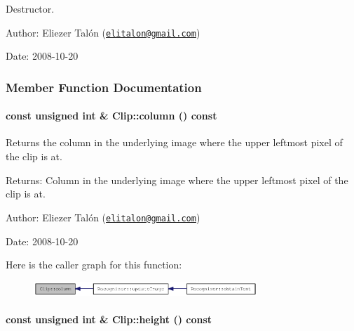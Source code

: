 Destructor. 

\begin{Desc}
\item[Author:]Eliezer Talón (\href{mailto:elitalon@gmail.com}{\tt elitalon@gmail.com}) \end{Desc}
\begin{Desc}
\item[Date:]2008-10-20 \end{Desc}


\subsubsection{Member Function Documentation}
\hypertarget{class_clip_06a34378fa0f23425d10bb04e9972a26}{
\paragraph[{column}]{\setlength{\rightskip}{0pt plus 5cm}const unsigned int \& Clip::column () const}\hfill}
\label{class_clip_06a34378fa0f23425d10bb04e9972a26}


Returns the column in the underlying image where the upper leftmost pixel of the clip is at. 

\begin{Desc}
\item[Returns:]Column in the underlying image where the upper leftmost pixel of the clip is at.\end{Desc}
\begin{Desc}
\item[Author:]Eliezer Talón (\href{mailto:elitalon@gmail.com}{\tt elitalon@gmail.com}) \end{Desc}
\begin{Desc}
\item[Date:]2008-10-20 \end{Desc}


Here is the caller graph for this function:\nopagebreak
\begin{figure}[H]
\begin{center}
\leavevmode
\includegraphics[width=239pt]{class_clip_06a34378fa0f23425d10bb04e9972a26_icgraph}
\end{center}
\end{figure}
\hypertarget{class_clip_939908a8dde602d25335792cc0fd5d97}{
\paragraph[{height}]{\setlength{\rightskip}{0pt plus 5cm}const unsigned int \& Clip::height () const}\hfill}
\label{class_clip_939908a8dde602d25335792cc0fd5d97}


